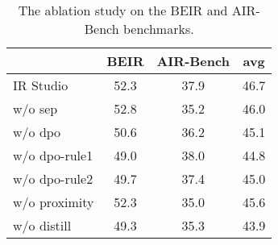 \begin{table*}[ht]
    \centering
    \small
    \begin{tabular}{l|cc|c}
        \toprule
         & BEIR & AIR-Bench & \textbf{avg} \\
        \midrule
        IR Studio & 52.3 & 37.9 & 46.7 \\
        \midrule
        \quad w/o sep & 52.8 & 35.2 & 46.0 \\
        \quad w/o dpo & 50.6 & 36.2 & 45.1 \\
        \quad w/o dpo-rule1 & 49.0 & 38.0 & 44.8 \\
        \quad w/o dpo-rule2 & 49.7 & 37.4 & 45.0 \\
        \quad w/o proximity & 52.3 & 35.0 & 45.6 \\
        \quad w/o distill & 49.3 & 35.3 & 43.9 \\
        \bottomrule
    \end{tabular}%
    \vspace{0.1cm}
    \caption{The ablation study on the BEIR and AIR-Bench benchmarks.}
    \label{ablation}
\end{table*}

